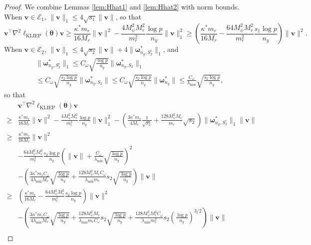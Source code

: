 \documentclass[11pt]{article}
\numberwithin{equation}{section}
\numberwithin{theorem}{section}
\def\fatv{\boldsymbol{v}}
\def\fattheta{\boldsymbol{\theta}}
\def\fatomega{\boldsymbol{\omega}}
\theoremstyle{definition}
\theoremstyle{remark}
\begin{document}
\begin{proof}
We combine Lemmas \ref{lem:Hhat1} and \ref{lem:Hhat2} with norm bounds.
When $\fatv \in \mathcal{E}_1$, $\|\fatv\|_1 \leq 4\sqrt{s_1} \|\fatv\|$, so that
\begin{equation}
\fatv^\top \nabla^2 \ell_\text{KLIEP}(\fattheta) \fatv
\geq \frac{\kappa^* m_r}{16 M_r} \|\fatv\|^2 - \frac{4M_\psi^2 M_r^2}{m_r^2} \frac{\log p}{n_y} \|\fatv\|_1^2
\geq \left( \frac{\kappa^* m_r}{16 M_r} - \frac{64M_\psi^2 M_r^2}{m_r^2} \frac{s_1 \log p}{n_y} \right) \|\fatv\|^2.
\end{equation}
When $\fatv \in \mathcal{E}_2$, $\|\fatv\|_1 \leq 4\sqrt{s_2}\|\fatv\| + 4\|\fatomega_{n_y,S_2^c}^*\|_1$, and
\begin{multline}
\|\fatomega_{n_y,S_2^c}^*\|_1
\leq C_\omega \sqrt{\frac{\log p}{n_y}} \|\fatomega_{n_y,S_2}^*\|_1 \\
\leq C_\omega \sqrt{\frac{s_2 \log p}{n_y}} \|\fatomega_{n_y,S_2}^*\|
\leq C_\omega \sqrt{\frac{s_2 \log p}{n_y}} \|\fatomega_{n_y}^*\|
\leq \frac{C_\omega}{\lambda_{\min}} \sqrt{\frac{s_2 \log p}{n_y}},
\end{multline}
so that
\begin{equation}
\begin{aligned}
& \fatv^\top \nabla^2 \ell_\text{KLIEP}(\fattheta) \fatv \\
\geq & \frac{\kappa^* m_r}{16 M_r} \|\fatv\|^2 - \frac{4M_\psi^2 M_r^2}{m_r^2} \frac{\log p}{n_y} \|\fatv\|_1^2 - \left( \frac{3\kappa^* m_r}{4M_r} \frac{1}{\sqrt{s_2}} + \frac{128M_\psi^2 M_r}{m_r} \sqrt{s_2} \right) \|\fatomega_{n_y,S_2^c}^*\|_1 \|\fatv\| \\
\geq & \frac{\kappa^* m_r}{16 M_r} \|\fatv\|^2 \\
&- \frac{64M_\psi^2 M_r^2}{m_r^2} \frac{s_2 \log p}{n_y} \left( \|\fatv\| + \frac{C_\omega}{\lambda_{\min}} \sqrt{\frac{\log p}{n_y}} \right)^2 \\
&- \left( \frac{3\kappa^* m_r C_\omega}{4\lambda_{\min} M_r} \sqrt{\frac{\log p}{n_y}} + \frac{128M_\psi^2 M_r C_\omega}{\lambda_{\min} m_r} s_2 \sqrt{\frac{\log p}{n_y}} \right) \|\fatv\| \\
\geq & \left( \frac{\kappa^* m_r}{16 M_r} - \frac{64M_\psi^2 M_r^2}{m_r^2} \frac{s_2 \log p}{n_y} \right) \|\fatv\|^2 \\
&- \left( \frac{3\kappa^* m_r C_\omega}{4\lambda_{\min} M_r} \sqrt{\frac{\log p}{n_y}} + \frac{128M_\psi^2 M_r}{\lambda_{\min} m_r C_\omega} s_2 \sqrt{\frac{\log p}{n_y}} + \frac{128M_\psi^2 M_r^2 C_\omega}{\lambda_{\min} m_r^2} s_2 \left( \frac{\log p}{n_y} \right)^{3/2} \right) \|\fatv\| \\

\end{aligned}
\end{equation}
\end{proof}
\end{document}
